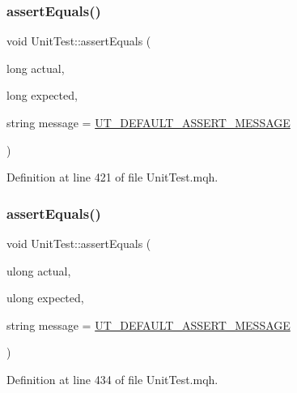 \subsubsection{\texorpdfstring{assert\+Equals()}{assertEquals()}\hspace{0.1cm}{\footnotesize\ttfamily [8/28]}}
{\footnotesize\ttfamily void Unit\+Test\+::assert\+Equals (\begin{DoxyParamCaption}\item[{long}]{actual,  }\item[{long}]{expected,  }\item[{string}]{message = {\ttfamily \mbox{\hyperlink{_unit_test_8mqh_a96f5d62188d09039ebc3f443c9120e39}{U\+T\+\_\+\+D\+E\+F\+A\+U\+L\+T\+\_\+\+A\+S\+S\+E\+R\+T\+\_\+\+M\+E\+S\+S\+A\+GE}}} }\end{DoxyParamCaption})}



Definition at line 421 of file Unit\+Test.\+mqh.

\mbox{\label{class_unit_test_ae2467005f0522daafb4a800fc6893845}} 
\subsubsection{\texorpdfstring{assert\+Equals()}{assertEquals()}\hspace{0.1cm}{\footnotesize\ttfamily [9/28]}}
{\footnotesize\ttfamily void Unit\+Test\+::assert\+Equals (\begin{DoxyParamCaption}\item[{ulong}]{actual,  }\item[{ulong}]{expected,  }\item[{string}]{message = {\ttfamily \mbox{\hyperlink{_unit_test_8mqh_a96f5d62188d09039ebc3f443c9120e39}{U\+T\+\_\+\+D\+E\+F\+A\+U\+L\+T\+\_\+\+A\+S\+S\+E\+R\+T\+\_\+\+M\+E\+S\+S\+A\+GE}}} }\end{DoxyParamCaption})}



Definition at line 434 of file Unit\+Test.\+mqh.

\mbox{\label{class_unit_test_a48c47b2f613072843bef926599978a0e}} 
